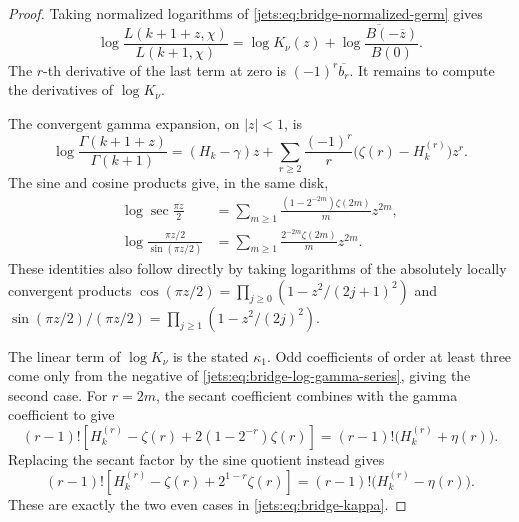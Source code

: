 \begin{proof}
Taking normalized logarithms of
\eqref{jets:eq:bridge-normalized-germ} gives
\[
 \log\frac{L(k+1+z,\chi)}{L(k+1,\chi)}
 =\log K_\nu(z)
  +\overline{\log\frac{B(-\overline z)}{B(0)}}.
\]
The \(r\)-th derivative of the last term at zero is
\((-1)^r\overline{b_r}\). It remains to compute the
derivatives of \(\log K_\nu\).

The convergent gamma expansion, on \(|z|<1\), is
\begin{equation}
 \log\frac{\Gamma(k+1+z)}{\Gamma(k+1)}
 =(H_k-\gamma)z+
 \sum_{r\geq2}\frac{(-1)^r}{r}
       \bigl(\zeta(r)-H_k^{(r)}\bigr)z^r.
 \label{jets:eq:bridge-log-gamma-series}
\end{equation}
The sine and cosine products give, in the same disk,
\begin{align}
 \log\sec\frac{\pi z}{2}
 &=\sum_{m\geq1}
   \frac{(1-2^{-2m})\zeta(2m)}{m}z^{2m},
 \label{jets:eq:bridge-log-sec-series}\\
 \log\frac{\pi z/2}{\sin(\pi z/2)}
 &=\sum_{m\geq1}
   \frac{2^{-2m}\zeta(2m)}{m}z^{2m}.
 \label{jets:eq:bridge-log-sinc-series}
\end{align}
These identities also follow directly by taking logarithms
of the absolutely locally convergent products
\(\cos(\pi z/2)=\prod_{j\geq0}(1-z^2/(2j+1)^2)\) and
\(\sin(\pi z/2)/(\pi z/2)
=\prod_{j\geq1}(1-z^2/(2j)^2)\).

The linear term of \(\log K_\nu\) is the stated
\(\kappa_1\). Odd coefficients of order at least three come
only from the negative of
\eqref{jets:eq:bridge-log-gamma-series}, giving the second case.
For \(r=2m\), the secant coefficient combines with the gamma
coefficient to give
\[
 (r-1)!\left[
  H_k^{(r)}-\zeta(r)+2(1-2^{-r})\zeta(r)\right]
 =(r-1)!\bigl(H_k^{(r)}+\eta(r)\bigr).
\]
Replacing the secant factor by the sine quotient instead gives
\[
 (r-1)!\left[
  H_k^{(r)}-\zeta(r)+2^{1-r}\zeta(r)\right]
 =(r-1)!\bigl(H_k^{(r)}-\eta(r)\bigr).
\]
These are exactly the two even cases in
\eqref{jets:eq:bridge-kappa}.
\end{proof}

